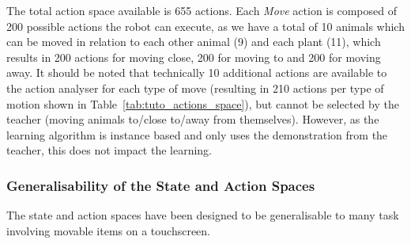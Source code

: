 The total action space available is 655 actions. Each \emph{Move} action is composed of 200 possible actions the robot can execute, as we have a total of 10 animals which can be moved in relation to each other animal (9) and each plant (11), which results in 200 actions for moving close, 200 for moving to and 200 for moving away. It should be noted that technically 10 additional actions are available to the action analyser for each type of move (resulting in 210 actions per type of motion shown in Table~\ref{tab:tuto_actions_space}), but cannot be selected by the teacher (moving animals to/close to/away from themselves). However, as the learning algorithm is instance based and only uses the demonstration from the teacher, this does not impact the learning. 



\subsubsection{Generalisability of the State and Action Spaces} \label{sec:tuto_general}

The state and action spaces have been designed to be generalisable to many task involving movable items on a touchscreen. 

